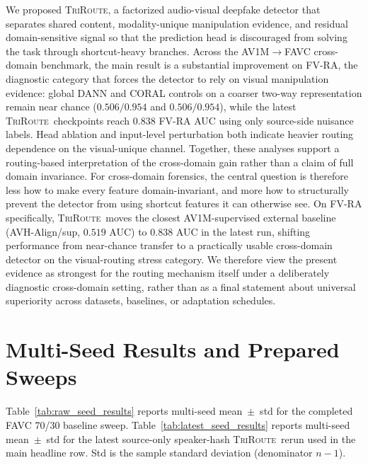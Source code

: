 \documentclass{article}
\newcommand{\method}{\textsc{TriRoute}}
\begin{document}
We proposed \method, a factorized audio-visual deepfake detector that separates shared content, modality-unique manipulation evidence, and residual domain-sensitive signal so that the prediction head is discouraged from solving the task through shortcut-heavy branches. Across the AV1M$\rightarrow$FAVC cross-domain benchmark, the main result is a substantial improvement on FV-RA, the diagnostic category that forces the detector to rely on visual manipulation evidence: global DANN and CORAL controls on a coarser two-way representation remain near chance ($0.506/0.954$ and $0.506/0.954$), while the latest \method\ checkpoints reach $0.838$ FV-RA AUC using only source-side nuisance labels. Head ablation and input-level perturbation both indicate heavier routing dependence on the visual-unique channel. Together, these analyses support a routing-based interpretation of the cross-domain gain rather than a claim of full domain invariance. For cross-domain forensics, the central question is therefore less how to make every feature domain-invariant, and more how to structurally prevent the detector from using shortcut features it can otherwise see.
On FV-RA specifically, \method\ moves the closest AV1M-supervised external baseline (AVH-Align/sup, $0.519$ AUC) to $0.838$ AUC in the latest run, shifting performance from near-chance transfer to a practically usable cross-domain detector on the visual-routing stress category.
We therefore view the present evidence as strongest for the routing mechanism itself under a deliberately diagnostic cross-domain setting, rather than as a final statement about universal superiority across datasets, baselines, or adaptation schedules.




\newpage
\appendix
\section{Multi-Seed Results and Prepared Sweeps}
\label{app:seed_and_sweeps}

Table~\ref{tab:raw_seed_results} reports multi-seed mean~$\pm$~std for the completed FAVC 70/30 baseline sweep. Table~\ref{tab:latest_seed_results} reports multi-seed mean~$\pm$~std for the latest source-only speaker-hash \method\ rerun used in the main headline row. Std is the sample standard deviation (denominator $n-1$).
\end{document}
